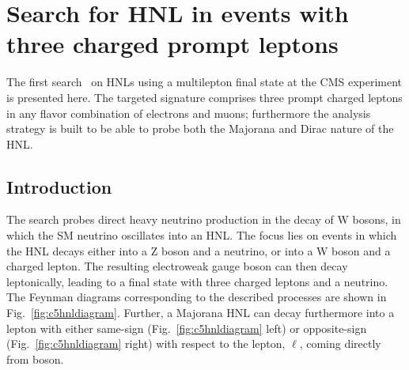 \chapter{Search for HNL in events with three charged prompt
  leptons} \label{Chapter5}

The first search~\cite{Sirunyan:2018mtv} on HNLs using a multilepton
final state at the CMS
experiment is presented here. The targeted signature comprises 
three prompt charged leptons in any flavor combination of electrons
and muons; furthermore the analysis strategy is built to be able to
probe both the
Majorana and Dirac nature of the HNL. 

\section{Introduction}
The search probes direct heavy neutrino production in the decay of W
bosons, in which the SM neutrino oscillates into an HNL. The focus
lies on events in which the HNL decays either into a Z boson and a
neutrino, or into a W boson and a charged lepton. The resulting
electroweak gauge boson can then decay leptonically, leading to a
final state with three charged leptons and a neutrino. The Feynman diagrams corresponding to the described processes are shown in 
Fig.~\ref{fig:c5hnldiagram}. Further, a Majorana HNL can decay
furthermore into a lepton with either same-sign (Fig.~\ref{fig:c5hnldiagram} left) 
or opposite-sign (Fig.~\ref{fig:c5hnldiagram} right) with respect to the lepton, $\ell$, coming directly from \PW boson. 

